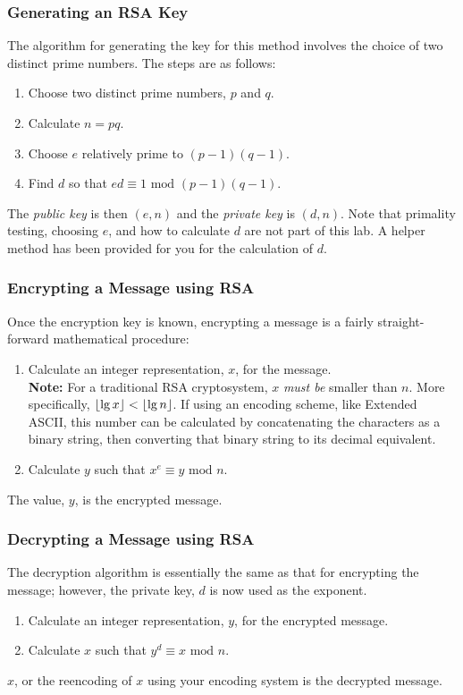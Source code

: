 			\subsubsection*{Generating an RSA Key}
				The algorithm for generating the key for this method involves the choice of two distinct prime numbers. The steps are as follows:
					\begin{enumerate}
						\item Choose two distinct prime numbers, $p$ and $q$.
						\item Calculate $n = pq$.
						\item Choose $e$ relatively prime to $(p - 1)(q - 1)$.
						\item Find $d$ so that $ed \equiv 1\text{ mod } (p - 1)(q - 1)$.
					\end{enumerate}
				The \emph{public key} is then $(e, n)$ and the \emph{private key} is $(d, n)$. Note that primality testing, choosing $e$, and how to calculate $d$ are not part of this lab. A helper method has been provided for you for the calculation of $d$.

			\subsubsection*{Encrypting a Message using RSA}
				Once the encryption key is known, encrypting a message is a fairly straight-forward mathematical procedure:
					\begin{enumerate}
						\item Calculate an integer representation, $x$, for the message.\\
						{\small\textbf{Note:} For a traditional RSA cryptosystem, $x$ \emph{must be} smaller than $n$. More specifically, $\left\lfloor \lg x \right\rfloor < \left\lfloor \lg n \right\rfloor$. If using an encoding scheme, like Extended ASCII, this number can be calculated by concatenating the characters as a binary string, then converting that binary string to its decimal equivalent.}
						\item Calculate $y$ such that $x^{e} \equiv y\text{ mod } n$.
					\end{enumerate}
				The value, $y$, is the encrypted message.

			\subsubsection*{Decrypting a Message using RSA}
				The decryption algorithm is essentially the same as that for encrypting the message; however, the private key, $d$ is now used as the exponent.
					\begin{enumerate}
						\item Calculate an integer representation, $y$, for the encrypted message.
						\item Calculate $x$ such that $y^{d} \equiv x\text{ mod } n$.
					\end{enumerate}
				$x$, or the reencoding of $x$ using your encoding system is the decrypted message.

